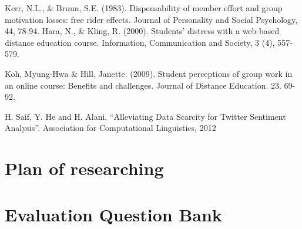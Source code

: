 \documentclass[letterpaper%
, twoside%
, 12pt%
,these%
, english%
,creativecommons,hyperref, withAlgo2e %
]{thETS}
\begin{document}
\begin{thebibliography}{01}
Kerr, N.L., \& Bruun, S.E. (1983). Dispensability of member effort and group motivation losses: free rider effects.
Journal of Personality and Social Psychology, 44, 78-94. 
Hara, N., \& Kling, R. (2000). Students' distress with a web-based distance education course. Information,
Communication and Society, 3 (4), 557-579. 


 Koh, Myung-Hwa \& Hill, Janette. (2009). Student perceptions of group work in an online course: Benefits and challenges. Journal of Distance Education. 23. 69-92. 

H. Saif, Y. He and H. Alani, “Alleviating Data Scarcity for Twitter
Sentiment Analysis”. Association for Computational Linguistics, 2012
\end{thebibliography}

\begin{appendices}
	\chapter {Plan of researching}
  

	\chapter{Evaluation Question Bank}
     
 
  
   

     
     


     
\end{appendices}
\end{document}

